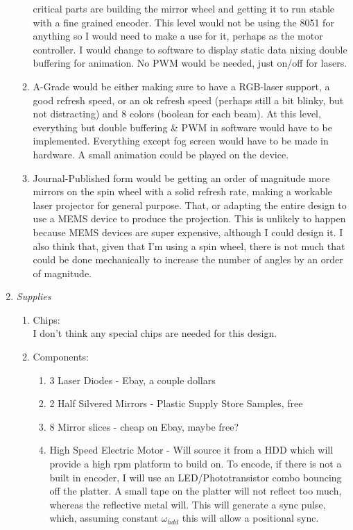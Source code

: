 \documentclass[12pt]{article}
\begin{document}
\begin{enumerate}
\begin{enumerate}
critical parts are building the mirror wheel and getting it to run
stable with a fine grained encoder. This level would not be using the 8051
for anything so I would need to make a use for it, perhaps as
the motor controller. I would change to software to display static data
nixing double buffering for animation.
No PWM would be needed, just on/off for lasers.
\item A-Grade would be either making sure to have a RGB-laser support,
a good refresh speed, or an ok refresh speed (perhaps still a bit
blinky, but not distracting) and 8 colors (boolean for each beam). At this
level, everything but double buffering \& PWM in software
would have to be implemented. Everything except fog screen would have to be made in hardware.
A small animation could be played on the device.
\item Journal-Published form would be getting an order of magnitude more
mirrors on the spin wheel with a solid refresh rate, making a workable
laser projector for general purpose. That, or adapting the entire design to use a MEMS
device to produce the projection. This is unlikely to happen because MEMS
devices are super expensive, although I could design it.
I also think that, given that I'm using a spin wheel, there is not much that
could be done mechanically to increase
the number of angles by an order of magnitude.
\end{enumerate}
\item
\emph{Supplies}
\begin{enumerate}
\item Chips:\\
I don't think any special chips are needed for this design.
\item Components:\\
\begin{enumerate}
\item 3 Laser Diodes - Ebay, a couple dollars
\item 2 Half Silvered Mirrors - Plastic Supply Store Samples, free
\item 8 Mirror slices - cheap on Ebay, maybe free?
\item High Speed Electric Motor - Will source it from a HDD which will provide a high rpm platform
to build on. To encode, if there is not a built in encoder, I will use an 
LED/Phototransistor combo bouncing off the platter. A small 
tape on the platter will not reflect too much, whereas the reflective metal will. This will generate a sync
pulse, which, assuming constant $\omega_{hdd}$ this will allow a positional sync.

\end{enumerate}
\end{enumerate}
\end{enumerate}
\end{document}
